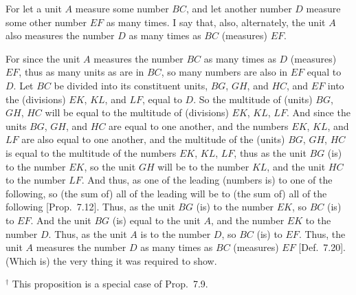 \begin{Parallel}{}{}
{For let a unit $A$ measure some number $BC$, and let another number $D$ measure some
other number $EF$ as many times. I  say that, also, alternately,
the unit $A$ also measures the number $D$ as many times
as $BC$ (measures) $EF$.

For since the unit $A$ measures the number $BC$ as many times as 
$D$ (measures) $EF$, thus as many units as are in $BC$, so many 
numbers are also in  $EF$ equal to $D$. Let $BC$ be divided into its
constituent units, $BG$, $GH$, and $HC$, and $EF$ into the (divisions) $EK$, $KL$, and $LF$, equal
to $D$. So the multitude of (units) $BG$, $GH$, $HC$ will be equal to the multitude
of (divisions) $EK$, $KL$, $LF$. And since the units $BG$, $GH$, and $HC$ are equal to
one another, and the numbers $EK$, $KL$,  and $LF$ are also equal to one another, and the multitude of the (units) $BG$, $GH$, $HC$ is
equal to the multitude of the numbers $EK$, $KL$, $LF$,
thus as the unit $BG$ (is) to the number $EK$, so the unit $GH$ will be to the number $KL$, and
the unit $HC$ to the number $LF$. And thus, as one of the leading (numbers is) to
one of the following, so (the sum of) all of the leading will be to (the sum of) all of the following 
[Prop.~7.12]. Thus, as the unit $BG$ (is) to the number $EK$,
so $BC$ (is) to $EF$. And the unit $BG$ (is) equal to the unit $A$, and the number
$EK$ to the number $D$. Thus, as the unit $A$ is to the number $D$, so $BC$ (is) to
$EF$. Thus, the unit $A$ measures the number $D$ as many times as $BC$ (measures)
$EF$ [Def.~7.20]. (Which is) the very thing it was required to show.}
\end{Parallel}
{\footnotesize\noindent$^\dag$ This proposition is a
special case of Prop.~7.9.}

